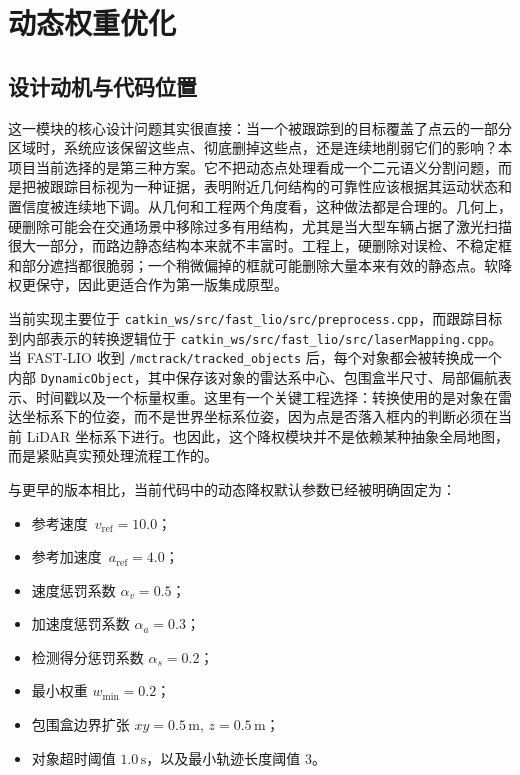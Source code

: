 \documentclass[utf8, a4paper, 12pt]{ctexart}
\begin{document}
\section{动态权重优化}
\subsection{设计动机与代码位置}
这一模块的核心设计问题其实很直接：当一个被跟踪到的目标覆盖了点云的一部分区域时，系统应该保留这些点、彻底删掉这些点，还是连续地削弱它们的影响？本项目当前选择的是第三种方案。它不把动态点处理看成一个二元语义分割问题，而是把被跟踪目标视为一种证据，表明附近几何结构的可靠性应该根据其运动状态和置信度被连续地下调。从几何和工程两个角度看，这种做法都是合理的。几何上，硬删除可能会在交通场景中移除过多有用结构，尤其是当大型车辆占据了激光扫描很大一部分，而路边静态结构本来就不丰富时。工程上，硬删除对误检、不稳定框和部分遮挡都很脆弱；一个稍微偏掉的框就可能删除大量本来有效的静态点。软降权更保守，因此更适合作为第一版集成原型。

当前实现主要位于 \texttt{catkin\_ws/src/fast\_lio/src/preprocess.cpp}，而跟踪目标到内部表示的转换逻辑位于 \texttt{catkin\_ws/src/fast\_lio/src/laserMapping.cpp}。当 FAST-LIO 收到 \texttt{/mctrack/tracked\_objects} 后，每个对象都会被转换成一个内部 \texttt{DynamicObject}，其中保存该对象的雷达系中心、包围盒半尺寸、局部偏航表示、时间戳以及一个标量权重。这里有一个关键工程选择：转换使用的是对象在雷达坐标系下的位姿，而不是世界坐标系位姿，因为点是否落入框内的判断必须在当前 LiDAR 坐标系下进行。也因此，这个降权模块并不是依赖某种抽象全局地图，而是紧贴真实预处理流程工作的。

与更早的版本相比，当前代码中的动态降权默认参数已经被明确固定为：
\begin{itemize}[leftmargin=2em]
    \item 参考速度 \(\,v_{\mathrm{ref}}=10.0\)；
    \item 参考加速度 \(\,a_{\mathrm{ref}}=4.0\)；
    \item 速度惩罚系数 \(\alpha_v=0.5\)；
    \item 加速度惩罚系数 \(\alpha_a=0.3\)；
    \item 检测得分惩罚系数 \(\alpha_s=0.2\)；
    \item 最小权重 \(w_{\min}=0.2\)；
    \item 包围盒边界扩张 \(xy=0.5\,\mathrm{m},\,z=0.5\,\mathrm{m}\)；
    \item 对象超时阈值 \(1.0\,\mathrm{s}\)，以及最小轨迹长度阈值 3。
\end{itemize}
\end{document}
